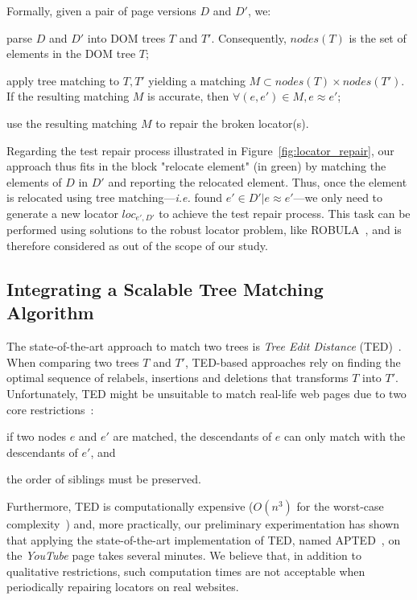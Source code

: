 Formally, given a pair of page versions $D$ and $D'$, we:
\begin{compactenum}
    \item parse $D$ and $D'$ into DOM trees $T$ and $T'$.
    Consequently, $nodes(T)$ is the set of elements in the DOM tree $T$;
    \item apply tree matching to $T, T'$ yielding a matching $M \subset nodes(T) \times nodes(T')$.
    If the resulting matching $M$ is accurate, then $\forall (e, e') \in M, e \approx e'$;
    \item use the resulting matching $M$ to repair the broken locator(s).
\end{compactenum}

Regarding the test repair process illustrated in Figure~\ref{fig:locator_repair}, our approach thus fits in the block "\textsf{relocate element}" (in green) by matching the elements of $D$ in $D'$ and reporting the relocated element. 
Thus, once the element is relocated using tree matching---\emph{i.e.} \erratum found $e' \in D'|e \approx e'$---we only need to generate a new locator $loc_{e', D'}$ to achieve the test repair process.
This task can be performed using solutions to the robust locator problem, like ROBULA~\cite{leotta2014reducing}, and is therefore considered as out of the scope of our study.

\subsection{Integrating a Scalable Tree Matching Algorithm}
The state-of-the-art approach to match two trees is \emph{Tree Edit Distance} (TED)~\cite{tai1979tree}. 
When comparing two trees $T$ and $T'$, TED-based approaches rely on finding the optimal sequence of relabels, insertions and deletions that transforms $T$ into $T'$.
Unfortunately, TED might be unsuitable to match real-life web pages due to two core restrictions~\cite{Kumar2011_FTM}:
\begin{inparaenum}
    \item if two nodes $e$ and $e'$ are matched, the descendants of $e$ can only match with the descendants of $e'$, and
    \item the order of siblings must be preserved.
\end{inparaenum}
Furthermore, TED is computationally expensive ($O(n^3)$ for the worst-case complexity~\cite{bringmann2018tree}) and, more practically, our preliminary experimentation has shown that applying the state-of-the-art implementation of TED, named APTED~\cite{pawlik2016tree}, on the \textit{YouTube} page takes several minutes. 
We believe that, in addition to qualitative restrictions, such computation times are not acceptable when periodically repairing locators on real websites.

